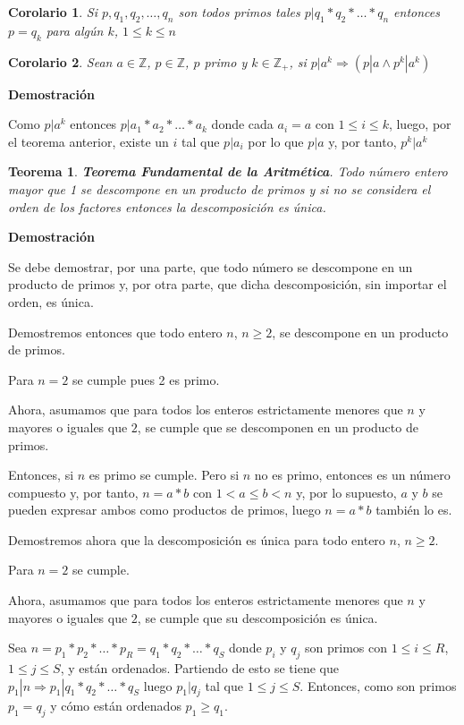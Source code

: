 \documentclass[a4paper,12pt]{report}
\newtheorem*{teo}{Teorema}
\newtheorem*{cor}{Corolario}
\begin{document}
\begin{cor}
 Si $p,q_1,q_2,\dots,q_n$ son todos primos tales $p|q_1*q_2*\dots*q_n$ entonces $p=q_k$ para algún $k$, $1\leq k \leq n$
\end{cor}


\begin{cor}
 Sean $a\in\mathbb{Z}$, $p\in\mathbb{Z}$, $p$ primo y $k\in\mathbb{Z}_+$, si $p|a^k\Rightarrow (p|a\wedge p^k|a^k)$
\end{cor}

\textbf{Demostración}

Como $p|a^k$ entonces $p|a_1*a_2*\dots *a_k$ donde cada $a_i=a$ con $1\leq i \leq k$, luego, por el teorema anterior, existe un $i$ tal que $p|a_i$ por lo que $p|a$  y, por tanto, $p^k|a^k$

\begin{teo}
 \textbf{Teorema Fundamental de la Aritmética}. Todo número entero mayor que 1 se descompone en un producto de primos y si no se considera el orden de los factores entonces la descomposición es única.
\end{teo}

\textbf{Demostración}

Se debe demostrar, por una parte, que todo número se descompone en un producto de primos y, por otra parte, que dicha descomposición, sin importar el orden, es única. 

Demostremos entonces que todo entero $n$, $n\geq 2$, se descompone en un producto de primos.

Para $n=2$ se cumple pues 2 es primo.

Ahora, asumamos que para todos los enteros estrictamente menores que $n$ y mayores o iguales que $2$, se cumple que se descomponen en un producto de primos.

Entonces, si  $n$ es primo se cumple. Pero si $n$ no es primo, entonces es un número compuesto y, por tanto, $n=a*b$ con $1 < a \leq b < n$ y, por lo supuesto, $a$ y $b$ se pueden expresar ambos como productos de primos, luego $n=a*b$ también lo es.

Demostremos ahora que la descomposición es única para todo entero $n$, $n\geq 2$.

Para $n=2$ se cumple.

Ahora, asumamos que para todos los enteros estrictamente menores que $n$ y mayores o iguales que $2$, se cumple que su descomposición es única.

Sea $n=p_1*p_2*\dots *p_R=q_1*q_2*\dots *q_S$ donde $p_i$ y $q_j$ son primos con  $1\leq i \leq R$, $1\leq j \leq S$, y están ordenados. Partiendo de esto se tiene que $p_1|n \Rightarrow p_1|q_1*q_2*\dots *q_S$ luego $p_1|q_j$ tal que $1\leq j \leq S$. Entonces, como son primos $p_1=q_j$ y cómo están ordenados $p_1\geq q_1$.
\end{document}

